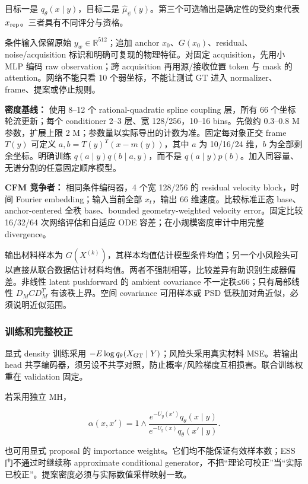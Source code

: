 \documentclass[
  11pt,
  a4paper,
]{article}
\begin{document}
目标一是 \(q_\theta(x\mid y)\)，目标二是
\(\widehat\mu_\psi(y)\)。第三个可选输出是确定性的受约束代表
\(x_{\rm rep}\)。三者具有不同评分与资格。

条件输入保留原始 \(y_w\in\mathbb{R}^{512}\)；追加 anchor
\(x_0\)、\(G(x_0)\)、residual、noise/acquisition
标识和明确可复现的物理特征。对固定 acquisition，先用小 MLP 编码 raw
observation；跨 acquisition 再用源/接收位置 token 与 mask 的
attention。网络不能只看 10 个弱坐标，不能让测试 GT 进入
normalizer、frame、提案或停止规则。

\textbf{密度基线：} 使用 8--12 个 rational-quadratic spline coupling
层，所有 66 个坐标轮流更新；每个 conditioner 2--3 层、宽 128/256，10--16
bins。先做约 0.3--0.8 M 参数，扩展上限 2
M；参数量以实际导出的计数为准。固定每对象正交 frame \(T(y)\) 可定义
\(a,b=T(y)^T(x-m(y))\)，其中 \(a\) 为 10/16/24 维，\(b\)
为全部剩余坐标。明确训练 \(q(a\mid y)q(b\mid a,y)\)，而不是
\(q(a\mid y)p(b)\)。加入同容量、无谱分割的任意固定顺序模型。

\textbf{CFM 竞争者：} 相同条件编码器，4 个宽 128/256 的 residual
velocity block，时间 Fourier embedding；输入当前全部 \(x_t\)，输出 66
维速度。比较标准正态 base、anchor-centered 全秩 base、bounded
geometry-weighted velocity error。固定比较 16/32/64 次网络评估和自适应
ODE 容差；在小规模密度审计中用完整 divergence。

输出材料样本为
\(G(X^{(k)})\)，其样本均值估计模型条件均值；另一个小风险头可以直接从联合数据估计材料均值。两者不强制相等，比较差异有助识别生成器偏差。非线性
latent pushforward 的 ambient covariance 不一定秩≤66；只有局部线性
\(D_MCD_M^T\) 有该秩上界。空间 covariance 可用样本或 PSD
低秩加对角近似，必须说明近似范围。

\hypertarget{ux8badux7ec3ux548cux5b8cux6574ux6821ux6b63}{%
\subsubsection{训练和完整校正}\label{ux8badux7ec3ux548cux5b8cux6574ux6821ux6b63}}

显式 density 训练采用
\(-E\log q_\theta(X_{\rm GT}\mid Y)\)；风险头采用真实材料 MSE。若输出
head
共享编码器，须另设不共享对照，防止概率/风险梯度互相损害。联合训练权重在
validation 固定。

若采用独立 MH，

\[\alpha(x,x')=1\wedge\frac{e^{-U_y(x')}q_\theta(x\mid y)}{e^{-U_y(x)}q_\theta(x'\mid y)}.\]

也可用显式 proposal 的 importance weights。它们均不能保证有效样本数；ESS
门不通过时继续称 approximate conditional
generator，不把``理论可校正''当``实际已校正''。提案密度必须与实际数值采样映射一致。
\end{document}
